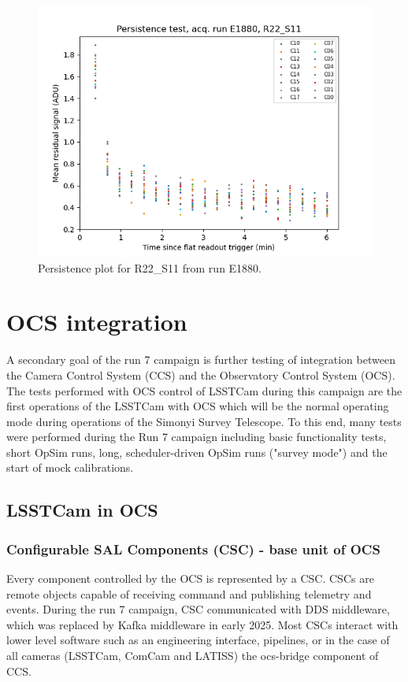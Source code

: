 \begin{figure}
    \centering
    \includegraphics[width=0.8\linewidth]{figures/ReferenceFigures/persistence_plot_LSSTCam_R22_S11_u_lsstccs_eo_persistence_E1880_w_2024_35_20241101T020526Z.png}
    \caption{Persistence plot for R22\_S11 from run E1880.}
    \label{fig:ref:persistence}
\end{figure}

\clearpage
\section{OCS integration}
A secondary goal of the run 7 campaign is further testing of integration between the Camera Control System (CCS) and the Observatory Control System (OCS). The tests performed with OCS control of LSSTCam during this campaign are the first operations of the LSSTCam with OCS which will be the normal operating mode during operations of the Simonyi Survey Telescope. To this end, many tests were performed during the Run 7 campaign including basic functionality tests, short OpSim runs, long, scheduler-driven OpSim runs ("survey mode") and the start of mock calibrations.

\subsection{LSSTCam in OCS}
\subsubsection{Configurable SAL Components (CSC) - base unit of OCS}

Every component controlled by the OCS is represented by a CSC. CSCs are remote objects capable of receiving command and publishing telemetry and events. During the run 7 campaign, CSC communicated with DDS middleware, which was replaced by Kafka middleware in early 2025. Most CSCs interact with lower level software such as an engineering interface, pipelines, or in the case of all cameras (LSSTCam, ComCam and LATISS) the ocs-bridge component of CCS.

